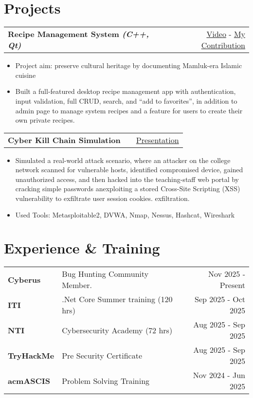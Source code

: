 \documentclass[a4paper,12pt]{article}
\makeatletter
\newenvironment{joblong}[2]
    {
    \begin{tabularx}{\linewidth}{@{}l X r@{}}
    \textbf{#1} & \hfill &  #2 \\[3.75pt]
    \end{tabularx}
    \begin{minipage}[t]{\linewidth}
    \begin{itemize}[nosep,after=\strut, leftmargin=1em, itemsep=3pt,label=--]
    }
    {
    \end{itemize}
    \end{minipage}    
    }
\makeatother
\begin{document}
\section{Projects}
\begin{joblong}{Recipe Management System \textit{(C++, Qt)}}{\href{https://drive.google.com/file/d/1I0ptV7O_kVz5_U3gNDEltskLosu585dp/view}{Video} -  \href{https://github.com/Mohamedeid-11/RMS_Demo}{My Contribution}}
\item Project aim: preserve cultural heritage by documenting Mamluk-era Islamic cuisine
\item Built a full-featured desktop recipe management app with authentication, input validation, full CRUD, search, and “add to favorites”, in addition to admin page to manage system recipes and a feature for users to create their own private recipes.
\end{joblong} 

\begin{joblong}{Cyber Kill Chain Simulation}{\href{https://docs.google.com/presentation/d/1j-j-t3HcRAJUKicOxggxbR5eOk6nW0KD/edit?usp=sharing\&ouid=100071722977707399783\&rtpof=true\&sd=true}{Presentation}}
\item Simulated a real-world attack scenario, where an attacker on the college network scanned for vulnerable hosts, identified compromised device, gained unauthorized access, and then hacked into the teaching-staff web portal by cracking simple passwords anexploiting a stored Cross-Site Scripting (XSS) vulnerability to exfiltrate user session cookies.
exfiltration.
\item Used Tools: Metasploitable2, DVWA, Nmap, Nessus, Hashcat, Wireshark
\end{joblong}

\section{Experience \& Training}

\begin{tabularx}{\linewidth}{@{}lX r@{}}
  \textbf{Cyberus} & Bug Hunting Community Member. & Nov 2025 - Present \\
  
  \textbf{ITI} & .Net Core Summer training (120 hrs) & Sep 2025 - Oct 2025 \\
  
  \textbf{NTI} & Cybersecurity Academy (72 hrs) & Aug 2025 - Sep 2025 \\
  
  \textbf{TryHackMe} & Pre Security Certificate & Aug 2025 - Sep 2025 \\
  
  \textbf{acmASCIS} & Problem Solving Training & Nov 2024 - Jun 2025 \\
\end{tabularx}
\end{document}
